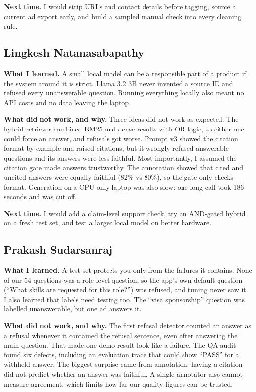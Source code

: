 \textbf{Next time.} I would strip URLs and contact details before tagging, source a current ad export early, and build a sampled manual check into every cleaning rule.

\subsection{Lingkesh Natanasabapathy}
\textbf{What I learned.} A small local model can be a responsible part of a product if the system around it is strict. Llama 3.2 3B never invented a source ID and refused every unanswerable question. Running everything locally also meant no API costs and no data leaving the laptop.

\textbf{What did not work, and why.} Three ideas did not work as expected. The hybrid retriever combined BM25 and dense results with OR logic, so either one could force an answer, and refusals got worse. Prompt v3 showed the citation format by example and raised citations, but it wrongly refused answerable questions and its answers were less faithful. Most importantly, I assumed the citation gate made answers trustworthy. The annotation showed that cited and uncited answers were equally faithful (82\% vs 80\%), so the gate only checks format. Generation on a CPU-only laptop was also slow: one long call took 186 seconds and was cut off.

\textbf{Next time.} I would add a claim-level support check, try an AND-gated hybrid on a fresh test set, and test a larger local model on better hardware.

\subsection{Prakash Sudarsanraj}
\textbf{What I learned.} A test set protects you only from the failures it contains. None of our 54 questions was a role-level question, so the app's own default question (``What skills are requested for this role?'') was refused, and tuning never saw it. I also learned that labels need testing too. The ``visa sponsorship'' question was labelled unanswerable, but one ad answers it.

\textbf{What did not work, and why.} The first refusal detector counted an answer as a refusal whenever it contained the refusal sentence, even after answering the main question. That made one demo result look like a failure. The QA audit found six defects, including an evaluation trace that could show ``PASS'' for a withheld answer. The biggest surprise came from annotation: having a citation did not predict whether an answer was faithful. A single annotator also cannot measure agreement, which limits how far our quality figures can be trusted.

